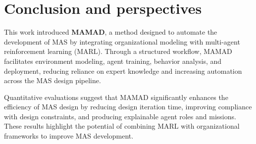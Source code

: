 \documentclass[pdflatex,sn-mathphys-num]{sn-jnl}%
\theoremstyle{thmstyleone}%
\theoremstyle{thmstyletwo}%
\theoremstyle{thmstylethree}%
\begin{document}
\section{Conclusion and perspectives}\label{sec:conclusion}

This work introduced \textbf{MAMAD}, a method designed to automate the development of MAS by integrating organizational modeling with multi-agent reinforcement learning (MARL). Through a structured workflow, MAMAD facilitates environment modeling, agent training, behavior analysis, and deployment, reducing reliance on expert knowledge and increasing automation across the MAS design pipeline. 

Quantitative evaluations suggest that MAMAD significantly enhances the efficiency of MAS design by reducing design iteration time, improving compliance with design constraints, and producing explainable agent roles and missions. These results highlight the potential of combining MARL with organizational frameworks to improve MAS development.
\end{document}
